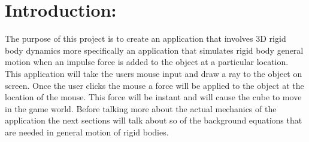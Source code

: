\section{Introduction:}
The purpose of this project is to create an application that involves 3D rigid body dynamics more specifically an application that simulates rigid body general motion when an impulse force is added to the object at a particular location.
This application will take the users mouse input and draw a ray to the object on screen.
Once the user clicks the mouse a force will be applied to the object at the location of the mouse.
This force will be instant and will cause the cube to move in the game world.
Before talking more about the actual mechanics of the application the next sections will talk about so of the background equations that are needed in general motion of rigid bodies.